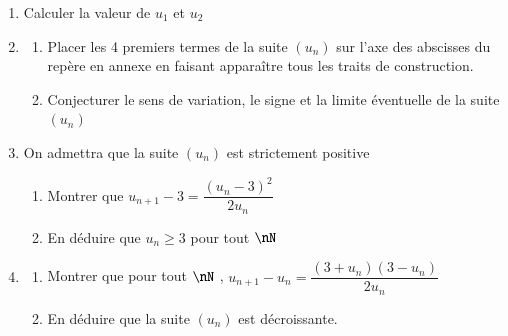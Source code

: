\documentclass[oneside,12pt]{article}
\begin{document}
\begin{enumerate}
	\item Calculer la valeur de $u_1$ et $u_2$
	\item \begin{enumerate}
		\item Placer les 4 premiers termes de la suite $(u_n)$ sur l'axe des abscisses du repère en annexe en faisant apparaître tous les traits de construction.
		\item Conjecturer le sens de variation, le signe et la limite éventuelle de la suite $(u_n)$
	\end{enumerate}
	\item On admettra que la suite $(u_n)$ est strictement positive
	\begin{enumerate}
		\item Montrer que $u_{n+1}-3=\dfrac{(u_n-3)^2}{2u_n}$
		\item En déduire que $u_n \geq 3$ \quad pour tout $\nN$
	\end{enumerate}
	\item \begin{enumerate}
		\item Montrer que pour tout $\nN$ , $u_{n+1}-u_n=\dfrac{(3+u_n)(3-u_n)}{2u_n}$
		\item En déduire que la suite $(u_n)$ est décroissante.
	\end{enumerate}
\end{enumerate}

\vspace{1cm}
\begin{center}
\end{center}



\newpage
\end{document}
